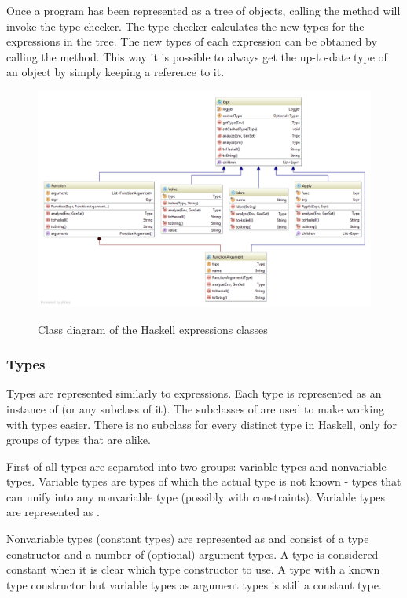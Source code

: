 Once a program has been represented as a tree of  objects, calling the  method will invoke the type checker.
The type checker calculates the new types for the expressions in the tree.
The new types of each expression can be obtained by calling the  method.
This way it is possible to always get the up-to-date type of an  object by simply keeping a reference to it.

\begin{figure}[h]
\centering
\includegraphics[scale=0.4]{Images/classdiagram-expr}
\label{fig:classdiagram-expr}
\caption{Class diagram of the Haskell expressions classes}
\end{figure}

\subsubsection{Types}

Types are represented similarly to expressions.
Each type is represented as an instance of  (or any subclass of it).
The subclasses of  are used to make working with types easier.
There is no subclass for every distinct type in Haskell, only for groups of types that are alike.

First of all types are separated into two groups: variable types and nonvariable types.
Variable types are types of which the actual type is not known - types that can unify into any nonvariable type (possibly with constraints).
Variable types are represented as .

Nonvariable types (constant types) are represented as  and consist of a type constructor and a number of (optional) argument types.
A type is considered constant when it is clear which type constructor to use. A type with a known type constructor but variable types as argument types is still a constant type.

